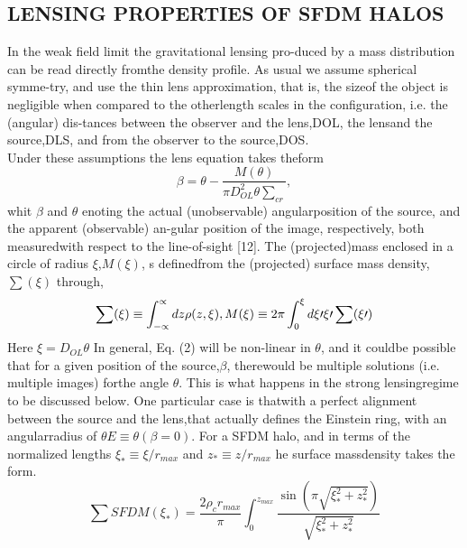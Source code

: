 \documentclass{article}\newcommand\Star[1]{#1\textsuperscript{*}}
\begin{document}
\begin{multicols}{2}
	\section{LENSING PROPERTIES OF SFDM HALOS}
	In  the  weak  field  limit  the  gravitational  lensing  pro-duced by a mass distribution can be read directly fromthe density profile.  As usual we assume spherical symme-try, and use the thin lens approximation, that is, the sizeof  the  object  is  negligible  when  compared  to  the  otherlength scales in the configuration, i.e.  the (angular) dis-tances between the observer and the lens,DOL, the lensand the source,DLS, and from the observer to the source,DOS.\\
	Under these assumptions the lens equation takes theform \\
	\begin{equation}\label{eq:2}
		\beta=\theta-\frac{M(\theta)}{\pi D^{2}_{OL}\theta\sum_{cr}},
	\end{equation}
whit \(\beta\) and \(\theta\) enoting the actual (unobservable) angularposition of the source, and the apparent (observable) an-gular position of the image, respectively, both measuredwith  respect  to  the  line-of-sight  [12].   The  (projected)mass  enclosed  in  a  circle  of  radius \(\xi\),\(M (\xi)\), s  definedfrom the (projected) surface mass density, \(\sum(\xi)\) through, 
   \begin{equation}\label{eq:3}
   	\sum(\xi)\equiv\int_{-\propto}^{\propto}dz \rho(z,\xi), \\ M(\xi)\equiv2\pi\int_{0}^{\xi}d\xi\prime\xi\prime\sum(\xi\prime)
   \end{equation}
Here \(\xi=D_{OL}\theta\) In general, Eq. (2) will be non-linear in \(\theta\), and it couldbe possible that for a given position of the source,\(\beta\), therewould  be  multiple  solutions  (i.e.   multiple  images)  forthe angle \(\theta\).  This is what happens in the strong lensingregime to be discussed below.  One particular case is thatwith a perfect alignment between the source and the lens,that actually defines the Einstein ring, with an angularradius of \(\theta E \equiv \theta(\beta=0)\).
For  a  SFDM  halo,  and  in  terms  of  the  normalized lengths \(\xi_{*}\equiv \xi/ r_{max}\) and \(z_{*}\equiv z/r_{max}\) he surface massdensity takes the form.\\
\begin{equation}\label{eq:4} 
	\sum SFDM(\xi_{*}) = \frac{2 \rho_{c} r_{max}}{\pi} \int_{0}^{z_{max}}\frac{\sin(\pi \sqrt{\xi^{2}_{*}+z^{2}_{*}})}{\sqrt{\xi^{2}_{*}+z^{2}_{*}}} 

\end{equation}
\end{multicols}
\end{document}

